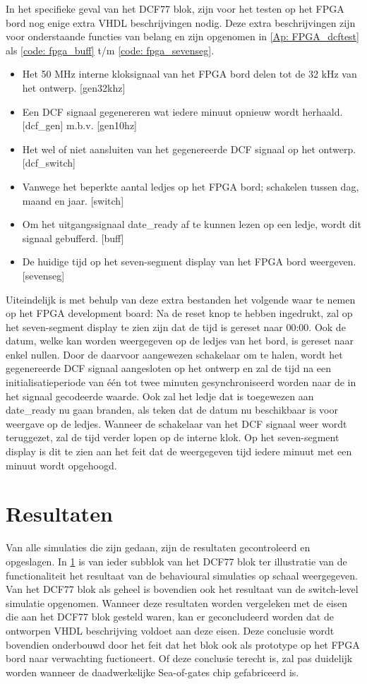 \noindent In het specifieke geval van het DCF77 blok, zijn voor het testen op het FPGA bord nog enige extra VHDL beschrijvingen nodig. Deze extra beschrijvingen zijn voor onderstaande functies van belang en zijn opgenomen in \cref{Ap: FPGA_dcftest} als \cref{code: fpga_buff} t/m \cref{code: fpga_sevenseg}.
\begin{itemize}[nolistsep]
\item Het 50 MHz interne kloksignaal van het FPGA bord delen tot de 32 kHz van het ontwerp. [gen32khz]
\item Een DCF signaal gegenereren wat iedere minuut opnieuw wordt herhaald. [dcf\_gen] m.b.v. [gen10hz]
\item Het wel of niet aansluiten van het gegenereerde DCF signaal op het ontwerp. [dcf\_switch]
\item Vanwege het beperkte aantal ledjes op het FPGA bord; schakelen tussen dag, maand en jaar. [switch]
\item Om het uitgangssignaal date\_ready af te kunnen lezen op een ledje, wordt dit signaal gebufferd. [buff]
\item De huidige tijd op het seven-segment display van het FPGA bord weergeven. [sevenseg]\\
\end{itemize}
Uiteindelijk is met behulp van deze extra bestanden het volgende waar te nemen op het FPGA development board: Na de reset knop te hebben ingedrukt, zal op het seven-segment display te zien zijn dat de tijd is gereset naar 00:00. Ook de datum, welke kan worden weergegeven op de ledjes van het bord, is gereset naar enkel nullen. Door de daarvoor aangewezen schakelaar om te halen, wordt het gegenereerde DCF signaal aangesloten op het ontwerp en zal de tijd na een initialisatieperiode van \'e\'en tot twee minuten gesynchroniseerd worden naar de in het signaal gecodeerde waarde. Ook zal het ledje dat is toegewezen aan date\_ready nu gaan branden, als teken dat de datum nu beschikbaar is voor weergave op de ledjes. Wanneer de schakelaar van het DCF signaal weer wordt teruggezet, zal de tijd verder lopen op de interne klok. Op het seven-segment display is dit te zien aan het feit dat de weergegeven tijd iedere minuut met een minuut wordt opgehoogd.

\section{Resultaten}
Van alle simulaties die zijn gedaan, zijn de resultaten gecontroleerd en opgeslagen. In \cref{} is van ieder subblok van het DCF77 blok ter illustratie van de functionaliteit het resultaat van de behavioural simulaties op schaal weergegeven. Van het DCF77 blok als geheel is bovendien ook het resultaat van de switch-level simulatie opgenomen. Wanneer deze resultaten worden vergeleken met de eisen die aan het DCF77 blok gesteld waren, kan er geconcludeerd worden dat de ontworpen VHDL beschrijving voldoet aan deze eisen. Deze conclusie wordt bovendien onderbouwd door het feit dat het blok ook als prototype op het FPGA bord naar verwachting fuctioneert. Of deze conclusie terecht is, zal pas duidelijk worden wanneer de daadwerkelijke Sea-of-gates chip gefabriceerd is.